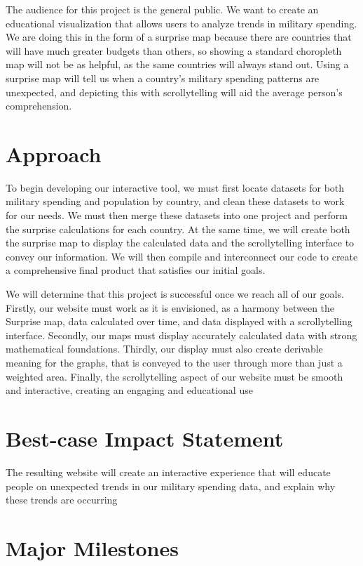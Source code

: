 \documentclass{proc}
\begin{document}
The audience for this project is the general public. We want to create an educational visualization that allows users to analyze trends in military spending. We are doing this in the form of a surprise map because there are countries that will have much greater budgets than others, so showing a standard choropleth map will not be as helpful, as the same countries will always stand out. Using a surprise map will tell us when a country's military spending patterns are unexpected, and depicting this with scrollytelling will aid the average person’s comprehension.

\section{Approach}


To begin developing our interactive tool, we must first locate datasets for both military spending and population by country, and clean these datasets to work for our needs. We must then merge these datasets into one project and perform the surprise calculations for each country. At the same time, we will create both the surprise map to display the calculated data and the scrollytelling interface to convey our information. We will then compile and interconnect our code to create a comprehensive final product that satisfies our initial goals.


We will determine that this project is successful once we reach all of our goals. Firstly, our website must work as it is envisioned, as a harmony between the Surprise map, data calculated over time, and data displayed with a scrollytelling interface. Secondly, our maps must display accurately calculated data with strong mathematical foundations. Thirdly, our display must also create derivable meaning for the graphs, that is conveyed to the user through more than just a weighted area. Finally, the scrollytelling aspect of our website must be smooth and interactive, creating an engaging and educational use


\section{Best-case Impact Statement}

The resulting website will create an interactive experience that will educate people on unexpected trends in our military spending data, and explain why these trends are occurring

\section{Major Milestones}
\end{document}
